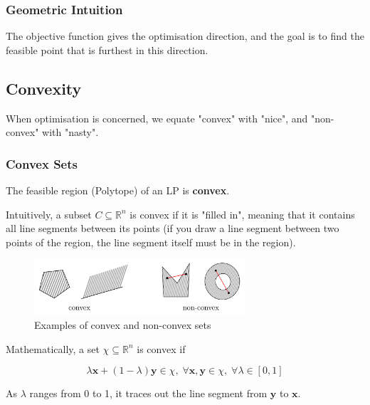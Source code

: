 \documentclass{article}
\begin{document}
\subsubsection{Geometric Intuition}
The objective function gives the optimisation direction, and the goal is to find the feasible point that is furthest in this direction. 

\subsection{Convexity}
When optimisation is concerned, we equate "convex" with "nice", and "non-convex" with "nasty". 

\subsubsection{Convex Sets}

\begin{theorem}
    The feasible region (Polytope) of an LP is \textbf{convex}. 
\end{theorem}

\noindent Intuitively, a subset $C\subseteq \mathbb{R}^{n}$ is convex if it is "filled in", meaning that it contains all line segments between its points (if you draw a line segment between two points of the region, the line segment itself must be in the region). 

\begin{figure}[H]
    \centering
    \includegraphics[width=0.7\textwidth]{Images/convexity.png}
    \caption{Examples of convex and non-convex sets}
    \label{fig:1-convex}
\end{figure} 

\noindent Mathematically, a set $\chi \subseteq \mathbb{R}^{n}$ is convex if 

\begin{equation*}
    \lambda \mathbf{x} + (1-\lambda)\mathbf{y} \in \chi, \; \forall \mathbf{x}, \mathbf{y} \in \chi, \; \forall \lambda \in [0,1]
\end{equation*}

As $\lambda$ ranges from 0 to 1, it traces out the line segment from $\mathbf{y}$ to $\mathbf{x}$.
\end{document}
